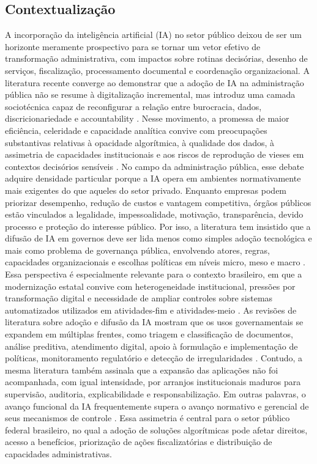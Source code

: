 \documentclass[12pt,a4paper]{article}
\begin{document}
\subsection{Contextualização}
\label{sec:org64084ee}
A incorporação da inteligência artificial (IA) no setor público deixou de ser um horizonte meramente prospectivo para se tornar um vetor efetivo de transformação administrativa, com impactos sobre rotinas decisórias, desenho de serviços, fiscalização, processamento documental e coordenação organizacional. A literatura recente converge ao demonstrar que a adoção de IA na administração pública não se resume à digitalização incremental, mas introduz uma camada sociotécnica capaz de reconfigurar a relação entre burocracia, dados, discricionariedade e accountability \autocite{madan2022ai} \autocite{criado2024artificial}. Nesse movimento, a promessa de maior eficiência, celeridade e capacidade analítica convive com preocupações substantivas relativas à opacidade algorítmica, à qualidade dos dados, à assimetria de capacidades institucionais e aos riscos de reprodução de vieses em contextos decisórios sensíveis \autocite{parycek2023artificial} \autocite{batool2025ai}.
No campo da administração pública, esse debate adquire densidade particular porque a IA opera em ambientes normativamente mais exigentes do que aqueles do setor privado. Enquanto empresas podem priorizar desempenho, redução de custos e vantagem competitiva, órgãos públicos estão vinculados a legalidade, impessoalidade, motivação, transparência, devido processo e proteção do interesse público. Por isso, a literatura tem insistido que a difusão de IA em governos deve ser lida menos como simples adoção tecnológica e mais como problema de governança pública, envolvendo atores, regras, capacidades organizacionais e escolhas políticas em níveis micro, meso e macro \autocite{criado2024artificial}. Essa perspectiva é especialmente relevante para o contexto brasileiro, em que a modernização estatal convive com heterogeneidade institucional, pressões por transformação digital e necessidade de ampliar controles sobre sistemas automatizados utilizados em atividades-fim e atividades-meio \autocite{serra2024a}.
As revisões de literatura sobre adoção e difusão da IA mostram que os usos governamentais se expandem em múltiplas frentes, como triagem e classificação de documentos, análise preditiva, atendimento digital, apoio à formulação e implementação de políticas, monitoramento regulatório e detecção de irregularidades \autocite{madan2022ai}. Contudo, a mesma literatura também assinala que a expansão das aplicações não foi acompanhada, com igual intensidade, por arranjos institucionais maduros para supervisão, auditoria, explicabilidade e responsabilização. Em outras palavras, o avanço funcional da IA frequentemente supera o avanço normativo e gerencial de seus mecanismos de controle \autocite{batool2025ai}. Essa assimetria é central para o setor público federal brasileiro, no qual a adoção de soluções algorítmicas pode afetar direitos, acesso a benefícios, priorização de ações fiscalizatórias e distribuição de capacidades administrativas.
\end{document}
